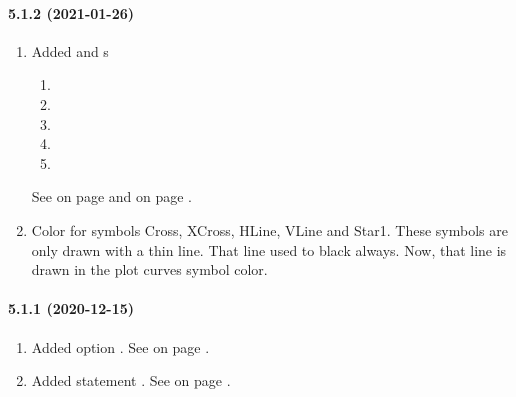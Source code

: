 \paragraph{5.1.2 (2021-01-26)}  %
\begin{enumerate}
\item Added \FUNCTION{} \ONCYCLEEVENT{} and \REASON s
  \begin{enumerate}
  \item \REASONCYCLECLEAR
  \item \REASONCYCLEDELETE
  \item \REASONCYCLENEW
  \item \REASONCYCLERENAME
  \item \REASONCYCLESWITCH
  \end{enumerate}
  See  on page \pageref{sec:funcidentifiers} and
   on page \pageref{fuexpressionsreason}.
\item Color for \PLOTTWOD symbols Cross, XCross, HLine, VLine and Star1.
  These symbols are only drawn with a thin line. That line used to black always.
  Now, that line is drawn in the plot curves symbol color.
\end{enumerate}

\paragraph{5.1.1 (2020-12-15)}  %
\begin{enumerate}
\item Added \LIST{} option \SORT{} \DISABLE.
      See  on page \pageref{dia:uilistoptionlist}.
\item Added \FUNCTION{} statement \DATASIZE.
      See  on page \pageref{dia:datastatement}.
\end{enumerate}
